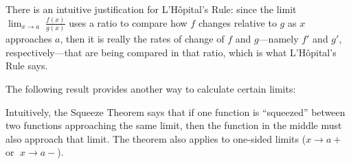 There is an intuitive justification for L'H\^{o}pital's Rule: since the limit
$\lim_{x \to a}\;\frac{f(x)}{g(x)}$
uses a ratio to compare how $f$ changes relative to $g$ as $x$ approaches $a$,
then it is really the rates of change of $f$ and $g$---namely $f'$ and $g'$,
respectively---that are being compared in that ratio, which is what
L'H\^{o}pital's Rule says.

The following result provides another way to calculate certain limits:


Intuitively, the Squeeze Theorem says that if one function is ``squeezed''
between two functions approaching the same limit, then the function in the
middle must also approach that limit. The theorem also applies to one-sided
limits ($x \to a+\;$ or $\;x \to a-$).

